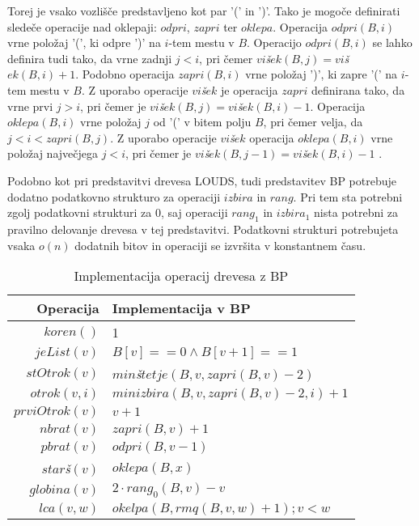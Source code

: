 Torej je vsako vozlišče predstavljeno kot par '(' in ')'. Tako je mogoče definirati sledeče operacije nad oklepaji: $odpri$, $zapri$ ter $oklepa$. Operacija $odpri(B,i)$ vrne položaj '(', ki odpre ')' na $i$-tem mestu v $B$. Operacijo $odpri(B,i)$ se lahko definira tudi tako, da vrne zadnji $j<i$, pri čemer $vi$\textit{š}$ek(B,j)=vi$\textit{š}$ek(B,i)+1$. Podobno operacija $zapri(B,i)$ vrne položaj ')', ki zapre '(' na $i$-tem mestu v $B$. Z uporabo operacije $vi$\textit{š}$ek$ je operacija $zapri$ definirana tako, da vrne prvi $j>i$, pri čemer je $vi$\textit{š}$ek(B,j)=vi$\textit{š}$ek(B,i)-1$. Operacija $oklepa(B,i)$ vrne položaj $j$ od '(' v bitem polju $B$, pri čemer velja, da $j<i<zapri(B,j)$. Z uporabo operacije $vi$\textit{š}$ek$ operacija $oklepa(B,i)$ vrne položaj največjega $j<i$, pri čemer je $vi$\textit{š}$ek(B,j-1)=vi$\textit{š}$ek(B,i)-1$ \cite{Navarro2016}.

Podobno kot pri predstavitvi drevesa LOUDS, tudi predstavitev BP potrebuje dodatno podatkovno strukturo za operaciji $izbira$ in $rang$. Pri tem sta potrebni zgolj podatkovni strukturi za $0$, saj  operaciji $rang_1$ in $izbira_1$ nista potrebni za pravilno delovanje drevesa v tej predstavitvi. Podatkovni strukturi potrebujeta vsaka $o(n)$ dodatnih bitov in operaciji se izvršita v konstantnem času.

\begin{table}[htb]
    \centering
      \caption{Implementacija operacij drevesa z BP}
    \begin{tabular}{r|l}
\textbf{Operacija}& \textbf{Implementacija v BP} \\\hline
         $koren()$& 1\\
         $jeList(v)$& $B[v]==0 \wedge B[v+1]==1$\\
         $stOtrok(v)$& $min$\textit{š}$tetje(B,v,zapri(B,v)-2)$\\
         $otrok(v,i)$&  $minizbira(B,v,zapri(B,v)-2,i)+1$\\
         $prviOtrok(v)$& $v+1$\\
         $nbrat(v)$& $zapri(B,v)+1$ \\
         $pbrat(v)$& $odpri(B,v-1)$ \\
         $star$\textit{š}$(v)$& $oklepa(B,x)$ \\
         $globina(v)$& $2\cdot rang_0(B,v)-v$ \\
         $lca(v,w)$&  $okelpa(B,rmq(B,v,w)+1);v<w$\\
    \end{tabular}  
    \label{tab:BPop}
\end{table}

